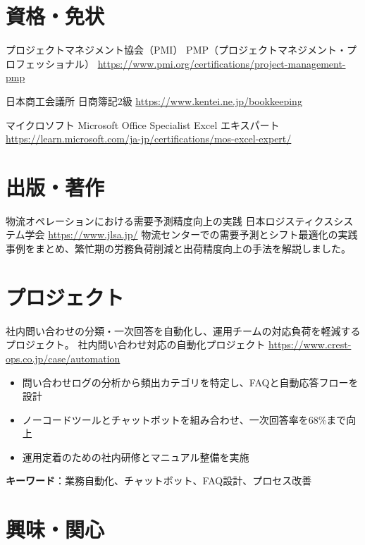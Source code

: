 \documentclass[a4paper, serif, 10pt]{moderncv}
\begin{document}
\section{資格・免状}

        {プロジェクトマネジメント協会（PMI）}
        {PMP（プロジェクトマネジメント・プロフェッショナル）}
        {\url{https://www.pmi.org/certifications/project-management-pmp}}
        {}
        {}

        {日本商工会議所}
        {日商簿記2級}
        {\url{https://www.kentei.ne.jp/bookkeeping}}
        {}
        {}

        {マイクロソフト}
        {Microsoft Office Specialist Excel エキスパート}
        {\url{https://learn.microsoft.com/ja-jp/certifications/mos-excel-expert/}}
        {}
        {}
\section{出版・著作}

        {物流オペレーションにおける需要予測精度向上の実践}
        {日本ロジスティクスシステム学会}
        {\url{https://www.jlsa.jp/}}
        {}
        {物流センターでの需要予測とシフト最適化の実践事例をまとめ、繁忙期の労務負荷削減と出荷精度向上の手法を解説しました。}
\section{プロジェクト}

        {社内問い合わせの分類・一次回答を自動化し、運用チームの対応負荷を軽減するプロジェクト。}
        {社内問い合わせ対応の自動化プロジェクト}
        {\url{https://www.crest-ops.co.jp/case/automation}}
        {}
        {\begin{itemize}
\item 問い合わせログの分析から頻出カテゴリを特定し、FAQと自動応答フローを設計
\item ノーコードツールとチャットボットを組み合わせ、一次回答率を68\%まで向上
\item 運用定着のための社内研修とマニュアル整備を実施
\end{itemize}
\textbf{キーワード}：業務自動化、チャットボット、FAQ設計、プロセス改善}
\section{興味・関心}
\end{document}
